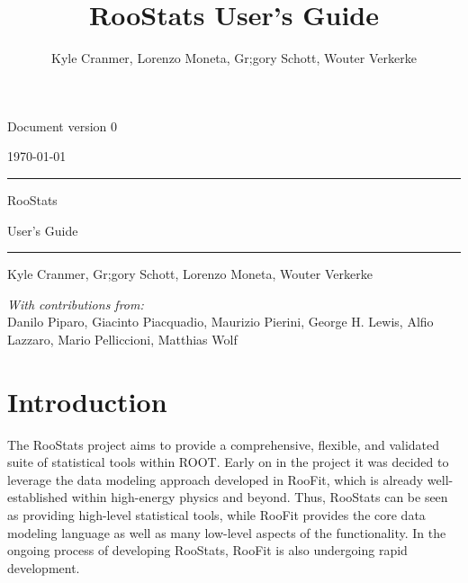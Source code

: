 \documentclass[11pt]{article}
\title{RooStats User's Guide}
\author{Kyle Cranmer, Lorenzo Moneta, Gr\eacute;gory Schott, Wouter Verkerke}
\begin{document}
\sf

{\flushright 
Document version 0 

\flushright 
\today

}

\vspace{2in}

\hrule
\vspace{.1in}
{\huge RooStats}
\vspace{.5in}

{\huge User's Guide}
\vspace{.1in}
\hrule

\vspace{.5in}

{\large Kyle Cranmer, Gr\eacute;gory Schott, Lorenzo Moneta, Wouter Verkerke}

\vspace{2in}
{\em With contributions from:}\\

Danilo Piparo, Giacinto Piacquadio, Maurizio Pierini, George H. Lewis, Alfio Lazzaro, Mario Pelliccioni, Matthias Wolf


\newpage
\tableofcontents 





\newpage
\section{Introduction}

The RooStats project aims to provide a comprehensive, flexible, and validated suite of statistical tools within ROOT.  Early on in the project it was decided to leverage the data modeling approach developed in RooFit, which is already well-established within high-energy physics and beyond.  Thus, RooStats can be seen as providing high-level statistical tools, while RooFit provides the core data modeling language as well as many low-level aspects of the functionality.   In the ongoing process of developing RooStats, RooFit is also undergoing rapid development.
\end{document}
